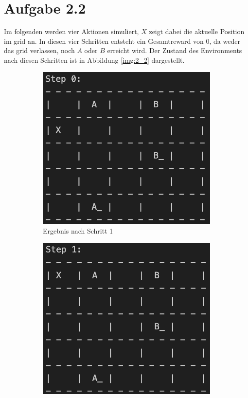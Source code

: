 \documentclass[11pt]{article}
\begin{document}
\section*{Aufgabe 2.2}

Im folgenden werden vier Aktionen simuliert, $X$ zeigt dabei die aktuelle Position im grid an.
In diesen vier Schritten entsteht ein Gesamtreward von $0$, da weder das grid verlassen, noch $A$ oder $B$ erreicht wird. Der Zustand des Environments nach diesen Schritten ist in Abbildung \ref{img:2_2} dargestellt.

\begin{figure}[h]
    \centering
    \begin{subfigure}[b]{0.45\textwidth}
        \centering
        \includegraphics[width=\textwidth]{img/step_0.png}
        \caption{Ergebnis nach Schritt 1}
    \end{subfigure}
    \hfill %
    \begin{subfigure}[b]{0.45\textwidth}
        \centering
        \includegraphics[width=\textwidth]{img/step_1.png}

\end{subfigure}
\end{figure}
\end{document}
